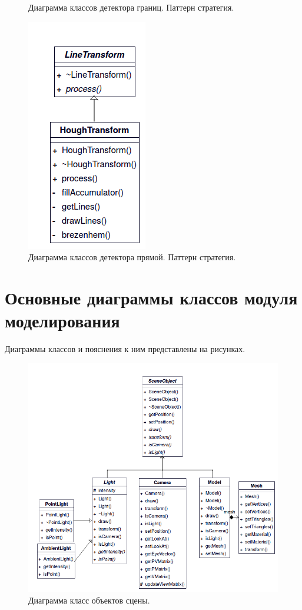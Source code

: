 \begin{figure}[H]
\begin{minipage}{.33\textwidth}
		\caption{Диаграмма классов детектора границ. Паттерн стратегия.}
		\label{class:edgedetector}
	\end{minipage}
	\begin{minipage}{.33\textwidth}
		\centering
		\includegraphics[scale=0.65]{classes/linetransform.png}
		\caption{Диаграмма классов детектора прямой. Паттерн стратегия.}
		\label{class:linetransform}
	\end{minipage}
\end{figure}

\section{Основные диаграммы классов модуля моделирования}
Диаграммы классов и пояснения к ним представлены на рисунках.
\begin{figure}[H]
	\centering
	\begin{minipage}{1\textwidth}
		\centering
		\includegraphics[scale=0.65]{classes/sceneobject.png}
		\caption{Диаграмма класс объектов сцены.}
		\label{class:sceneobject}
	\end{minipage}%
\end{figure}

